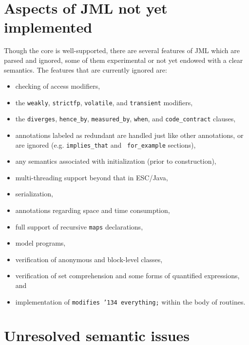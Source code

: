\documentclass{acm_proc_article-sp}
\begin{document}
\section{Aspects of JML not yet implemented}

Though the core is well-supported, there are several features of JML
which are parsed and ignored, some of them experimental or not yet
endowed with a clear semantics.  The features that are currently ignored are:
\setlength{\partopsep}{0in}\setlength{\parskip}{0in}\setlength{\itemsep}{0in}\setlength{\topsep}{0in}
\begin{itemize}
\setlength{\partopsep}{0in}\setlength{\parskip}{0in}\setlength{\itemsep}{0in}\setlength{\topsep}{0in}
\item checking of access modifiers,
\item the \texttt{weakly}, \texttt{strictfp}, \texttt{volatile}, and
  \texttt{transient} modifiers,
\item the \texttt{diverges}, \texttt{hence\_by}, \texttt{measured\_by}, \texttt{when}, and
\texttt{code\_contract}
  clauses,
\item annotations labeled as redundant are handled just like other
  annotations, or are ignored (e.g. \texttt{implies\_that} and {\tt
    for\_example} sections),
\item any semantics associated with initialization (prior to
  construction),
\item multi-threading support beyond that in ESC/Java,
\item serialization,
\item annotations regarding space and time consumption,
\item full support of recursive \texttt{maps} declarations,
\item model programs, 
\item verification of anonymous and block-level classes,
\item verification of set comprehension and some forms of quantified
  expressions, and
\item implementation of \texttt{modifies \char'134 everything;} within the body
  of routines.
\end{itemize}


\section{Unresolved semantic issues}
\end{document}
